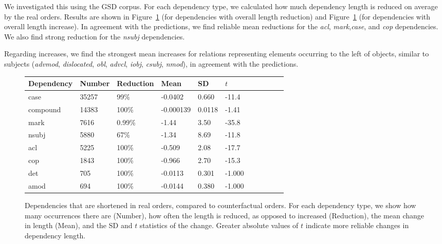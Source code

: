 \documentclass[11pt,a4paper]{article}
\begin{document}
We investigated this using the GSD corpus.
For each dependency type, we calculated how much dependency length is reduced on average by the real orders.
Results are shown in Figure~\ref{fig:shortened} (for dependencies with overall length reduction) and Figure~\ref{fig:shortened} (for dependencies with overall length increase).
In agreement with the predictions, we find reliable mean reductions for the \emph{acl}, \emph{mark},\emph{case}, and \emph{cop} dependencies.
We also find strong reduction for the \emph{nsubj} dependencies.


Regarding increases, we find the strongest mean increases for relations representing elements occurring to the left of objects, similar to subjects (\emph{advmod}, \emph{dislocated}, \emph{obl}, \emph{advcl}, \emph{iobj}, \emph{csubj}, \emph{nmod}), in agreement with the predictions.

\begin{figure}
\begin{center}
\begin{tabular}{l|llllllllll}
   Dependency  &Number &Reduction     &  Mean   &   SD &       $t$ \\ \hline
  case & 35257  &  99\% & -0.0402     &0.660  & -11.4   \\
 compound     &14383  &  100\%     & -0.000139   &0.0118 &  -1.41  \\ 
 mark  & 7616  &  0.99\% & -1.44       &3.50 &   -35.8   \\
  nsubj        & 5880  &  67\% & -1.34       &8.69  &  -11.8   \\
  acl          & 5225  &  100\%     & -0.509      &2.08  &  -17.7   \\
 cop   & 1843  &  100\%    &  -0.966      &2.70  &  -15.3   \\
 det          &  705  &  100\%    &  -0.0113     &0.301 &   -1.000 \\
 amod         &  694  &  100\%    &  -0.0144     &0.380 &   -1.000 \\
\end{tabular}
\end{center}
\caption{Dependencies that are shortened in real orders, compared to counterfactual orders. For each dependency type, we show how many occurrences there are (Number), how often the length is reduced, as opposed to increased (Reduction), the mean change in length (Mean), and the SD and $t$ statistics of the change. Greater absolute values of $t$ indicate more reliable changes in dependency length.}\label{fig:shortened}
\end{figure}
\end{document}
